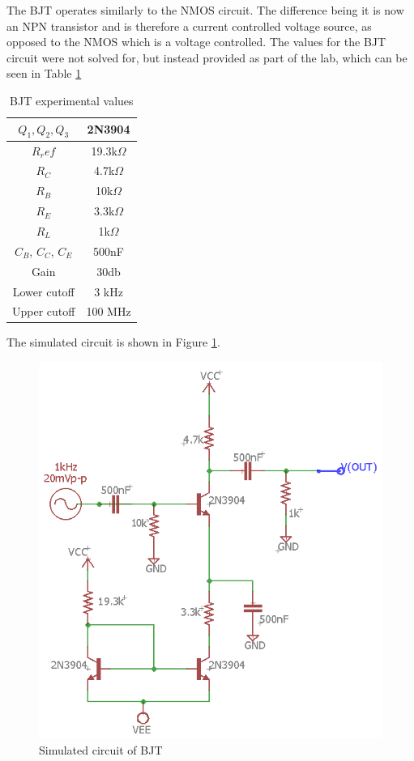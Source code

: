 
The BJT operates similarly to the NMOS circuit. The difference being it is now an NPN transistor and is therefore a current controlled voltage source, as opposed to the NMOS which is a voltage controlled. The values for the BJT circuit were not solved for, but instead provided as part of the lab, which can be seen in Table \ref{tab:bjttab}

\begin{table}[H]
	\centering
	\caption{BJT experimental values}
	\label{tab:bjttab}
	\begin{tabular}{|c|c|} \hline
		$Q_1, Q_2, Q_3$ & 2N3904        \\ \hline
		$R_ref$         & 19.3k$\Omega$ \\ \hline
		$R_C$           & 4.7k$\Omega$  \\ \hline
		$R_B$           & 10k$\Omega$   \\ \hline
		$R_E$           & 3.3k$\Omega$  \\ \hline
		$R_L$           & 1k$\Omega$    \\ \hline
		$C_B$, $C_C$, $C_E$ & 500nF      \\   \hline
		Gain            & 30db          \\  \hline
		Lower cutoff    & 3 kHz         \\  \hline
		Upper cutoff    & 100 MHz       \\  \hline  
	\end{tabular}
\end{table}
 The simulated circuit is shown in Figure \ref{fig:bjtsimcir}.
 
 \begin{figure}[H]
 	\centering
 	\includegraphics[width=.55\textwidth]{CircuitDevelopment/BJT_sim.png}
 	\caption{Simulated circuit of BJT}
 	\label{fig:bjtsimcir}
 \end{figure}
 
